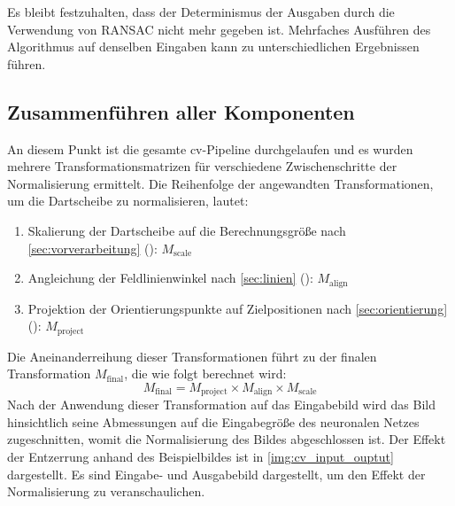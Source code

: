 Es bleibt festzuhalten, dass der Determinismus der Ausgaben durch die Verwendung von RANSAC nicht mehr gegeben ist. Mehrfaches Ausführen des Algorithmus auf denselben Eingaben kann zu unterschiedlichen Ergebnissen führen.

\subsection{Zusammenführen aller Komponenten}
\label{sec:zusammenfuehrung_aller_komponenten_cv}

An diesem Punkt ist die gesamte \ac{cv}-Pipeline durchgelaufen und es wurden mehrere Transformationsmatrizen für verschiedene Zwischenschritte der Normalisierung ermittelt. Die Reihenfolge der angewandten Transformationen, um die Dartscheibe zu normalisieren, lautet:

\begin{enumerate}
    \item Skalierung der Dartscheibe auf die Berechnungsgröße nach \autoref{sec:vorverarbeitung} (): $M_\text{scale}$
    \item Angleichung der Feldlinienwinkel nach \autoref{sec:linien} (): $M_\text{align}$
    \item Projektion der Orientierungspunkte auf Zielpositionen nach \autoref{sec:orientierung} (): $M_\text{project}$
\end{enumerate}

Die Aneinanderreihung dieser Transformationen führt zu der finalen Transformation $M_\text{final}$, die wie folgt berechnet wird:
\[ M_\text{final} = M_\text{project} \times M_\text{align} \times M_\text{scale} \]
Nach der Anwendung dieser Transformation auf das Eingabebild wird das Bild hinsichtlich seine Abmessungen auf die Eingabegröße des neuronalen Netzes zugeschnitten, womit die Normalisierung des Bildes abgeschlossen ist. Der Effekt der Entzerrung anhand des Beispielbildes ist in \autoref{img:cv_input_ouptut} dargestellt. Es sind Eingabe- und Ausgabebild dargestellt, um den Effekt der Normalisierung zu veranschaulichen.

